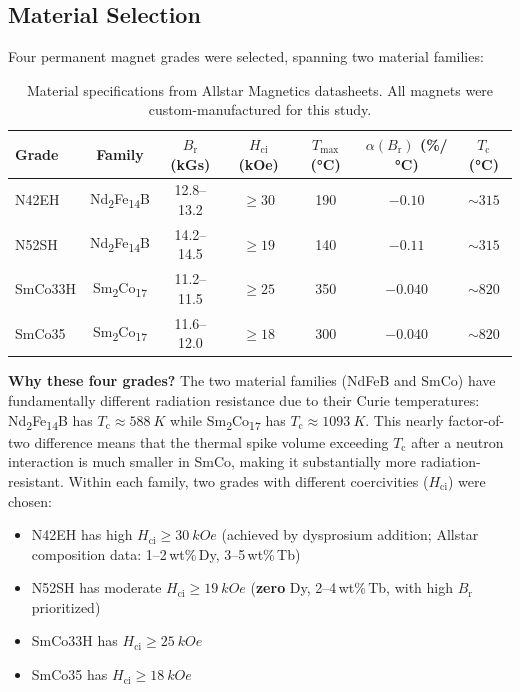 \documentclass[11pt,letterpaper]{article}
\newcommand{\NdFeB}{Nd\textsubscript{2}Fe\textsubscript{14}B}
\newcommand{\SmCo}{Sm\textsubscript{2}Co\textsubscript{17}}
\newcommand{\ndfeb}{NdFeB}
\newcommand{\smco}{SmCo}
\newcommand{\Tc}{T_\mathrm{c}}
\newcommand{\Hci}{H_\mathrm{ci}}
\newcommand{\Br}{B_\mathrm{r}}
\newcommand{\alphar}{\alpha(\Br)}
\begin{document}
\subsection{Material Selection}
\label{sec:materials}

Four permanent magnet grades were selected, spanning two material families:

\begin{table}[H]
\centering
\caption{Material specifications from Allstar Magnetics datasheets. All magnets
were custom-manufactured for this study.}
\label{tab:materials}
\begin{tabular}{@{}lcccccc@{}}
\toprule
\textbf{Grade} & \textbf{Family} & $\Br$ (kGs) & $\Hci$ (kOe) &
$T_\mathrm{max}$ (\si{\celsius}) & $\alphar$ (\%/\si{\celsius}) &
$\Tc$ (\si{\celsius}) \\
\midrule
N42EH  & \NdFeB  & 12.8--13.2 & $\geq 30$ & 190 & $-0.10$ & $\sim 315$ \\
N52SH  & \NdFeB  & 14.2--14.5 & $\geq 19$ & 140 & $-0.11$ & $\sim 315$ \\
SmCo33H & \SmCo  & 11.2--11.5 & $\geq 25$ & 350 & $-0.040$ & $\sim 820$ \\
SmCo35  & \SmCo  & 11.6--12.0 & $\geq 18$ & 300 & $-0.040$ & $\sim 820$ \\
\bottomrule
\end{tabular}
\end{table}

\textbf{Why these four grades?} The two material families (\ndfeb{} and \smco{})
have fundamentally different radiation resistance due to their Curie
temperatures: \NdFeB{} has $\Tc \approx \SI{588}{K}$ while \SmCo{} has $\Tc
\approx \SI{1093}{K}$. This nearly factor-of-two difference means that the
thermal spike volume exceeding $\Tc$ after a neutron interaction is much
smaller in \smco{}, making it substantially more radiation-resistant. Within
each family, two grades with different coercivities ($\Hci$) were chosen:
\begin{itemize}
    \item N42EH has high $\Hci \geq \SI{30}{kOe}$ (achieved by
    dysprosium addition; Allstar composition data: 1--2\,wt\%\,Dy, 3--5\,wt\%\,Tb)
    \item N52SH has moderate $\Hci \geq \SI{19}{kOe}$ (\textbf{zero} Dy,
    2--4\,wt\%\,Tb, with high $\Br$ prioritized)
    \item SmCo33H has $\Hci \geq \SI{25}{kOe}$
    \item SmCo35 has $\Hci \geq \SI{18}{kOe}$
\end{itemize}
\end{document}
